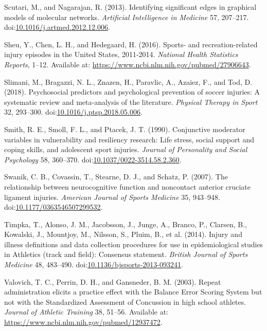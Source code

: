 \documentclass[utf8]{frontiersHLTH}
\begin{document}
\leavevmode\hypertarget{ref-Scutari2013}{}%
Scutari, M., and Nagarajan, R. (2013). Identifying significant edges in
graphical models of molecular networks. \emph{Artificial Intelligence in
Medicine} 57, 207--217.
doi:\href{https://doi.org/10.1016/j.artmed.2012.12.006}{10.1016/j.artmed.2012.12.006}.

\leavevmode\hypertarget{ref-Sheu2016}{}%
Sheu, Y., Chen, L. H., and Hedegaard, H. (2016). Sports- and
recreation-related injury episodes in the United States, 2011-2014.
\emph{National Health Statistics Reports}, 1--12. Available at:
\url{https://www.ncbi.nlm.nih.gov/pubmed/27906643}.

\leavevmode\hypertarget{ref-Slimani2018}{}%
Slimani, M., Bragazzi, N. L., Znazen, H., Paravlic, A., Azaiez, F., and
Tod, D. (2018). Psychosocial predictors and psychological prevention of
soccer injuries: A systematic review and meta-analysis of the
literature. \emph{Physical Therapy in Sport} 32, 293--300.
doi:\href{https://doi.org/10.1016/j.ptsp.2018.05.006}{10.1016/j.ptsp.2018.05.006}.

\leavevmode\hypertarget{ref-Smith1990}{}%
Smith, R. E., Smoll, F. L., and Ptacek, J. T. (1990). Conjunctive
moderator variables in vulnerability and resiliency research: Life
stress, social support and coping skills, and adolescent sport injuries.
\emph{Journal of Personality and Social Psychology} 58, 360--370.
doi:\href{https://doi.org/10.1037/0022-3514.58.2.360}{10.1037/0022-3514.58.2.360}.

\leavevmode\hypertarget{ref-Swanik2007}{}%
Swanik, C. B., Covassin, T., Stearne, D. J., and Schatz, P. (2007). The
relationship between neurocognitive function and noncontact anterior
cruciate ligament injuries. \emph{American Journal of Sports Medicine}
35, 943--948.
doi:\href{https://doi.org/10.1177/0363546507299532}{10.1177/0363546507299532}.

\leavevmode\hypertarget{ref-Timpka2014}{}%
Timpka, T., Alonso, J. M., Jacobsson, J., Junge, A., Branco, P.,
Clarsen, B., Kowalski, J., Mountjoy, M., Nilsson, S., Pluim, B., et al.
(2014). Injury and illness definitions and data collection procedures
for use in epidemiological studies in Athletics (track and field):
Consensus statement. \emph{British Journal of Sports Medicine} 48,
483--490.
doi:\href{https://doi.org/10.1136/bjsports-2013-093241}{10.1136/bjsports-2013-093241}.

\leavevmode\hypertarget{ref-Valovich2003}{}%
Valovich, T. C., Perrin, D. H., and Gansneder, B. M. (2003). Repeat
administration elicits a practice effect with the Balance Error Scoring
System but not with the Standardized Assessment of Concussion in high
school athletes. \emph{Journal of Athletic Training} 38, 51--56.
Available at: \url{https://www.ncbi.nlm.nih.gov/pubmed/12937472}.
\end{document}
